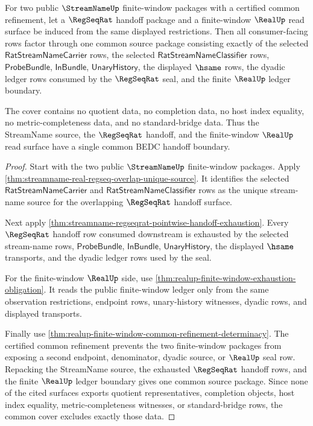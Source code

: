 \begin{theorem}
\label{thm:streamname-regseqrat-realup-common-handoff-cover}
For two public $\StreamNameUp$ finite-window packages with a certified common
refinement, let a $\RegSeqRat$ handoff package and a finite-window $\RealUp$
read surface be induced from the same displayed restrictions. Then all
consumer-facing rows factor through one common source package consisting
exactly of the selected $\mathsf{RatStreamNameCarrier}$ rows, the selected
$\mathsf{RatStreamNameClassifier}$ rows, $\mathsf{ProbeBundle}$,
$\mathsf{InBundle}$, $\mathsf{UnaryHistory}$, the displayed $\hsame$ rows, the
dyadic ledger rows consumed by the $\RegSeqRat$ seal, and the finite $\RealUp$
ledger boundary.

The cover contains no quotient data, no completion data, no host index
equality, no metric-completeness data, and no standard-bridge data. Thus the
StreamName source, the $\RegSeqRat$ handoff, and the finite-window $\RealUp$
read surface have a single common BEDC handoff boundary.
\end{theorem}
\begin{proof}
Start with the two public $\StreamNameUp$ finite-window packages. Apply
\autoref{thm:streamname-real-regseq-overlap-unique-source}. It identifies the
selected $\mathsf{RatStreamNameCarrier}$ and
$\mathsf{RatStreamNameClassifier}$ rows as the unique stream-name source for
the overlapping $\RegSeqRat$ handoff surface.

Next apply \autoref{thm:streamname-regseqrat-pointwise-handoff-exhaustion}.
Every $\RegSeqRat$ handoff row consumed downstream is exhausted by the
selected stream-name rows, $\mathsf{ProbeBundle}$, $\mathsf{InBundle}$,
$\mathsf{UnaryHistory}$, the displayed $\hsame$ transports, and the dyadic
ledger rows used by the seal.

For the finite-window $\RealUp$ side, use
\autoref{thm:realup-finite-window-exhaustion-obligation}. It reads the public
finite-window ledger only from the same observation restrictions, endpoint
rows, unary-history witnesses, dyadic rows, and displayed transports.

Finally use \autoref{thm:realup-finite-window-common-refinement-determinacy}.
The certified common refinement prevents the two finite-window packages from
exposing a second endpoint, denominator, dyadic source, or $\RealUp$ seal row.
Repacking the StreamName source, the exhausted $\RegSeqRat$ handoff rows, and
the finite $\RealUp$ ledger boundary gives one common source package. Since
none of the cited surfaces exports quotient representatives, completion
objects, host index equality, metric-completeness witnesses, or standard-bridge
rows, the common cover excludes exactly those data.
\end{proof}

